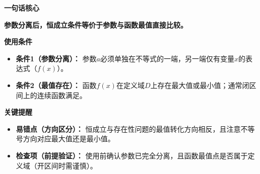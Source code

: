 \begin{summarybox}
	\textbf{\textcolor{CSummary}{一句话核心}}

	\textbf{参数分离后，恒成立条件等价于参数与函数最值直接比较。}

	\medskip
	\textbf{\textcolor{CSummary}{使用条件}}
	\begin{itemize}[leftmargin=*, itemsep=0.5em, topsep=0.4em]
		\item \textbf{条件1（参数分离）：} 参数$a$必须单独在不等式的一端，另一端仅有变量$x$的表达式（$f(x)$）。
		\item \textbf{条件2（最值存在）：} 函数$f(x)$在定义域$D$上存在最大值或最小值；通常闭区间上的连续函数满足。
	\end{itemize}

	\medskip
	\textbf{\textcolor{CSummary}{关键提醒}}
	\begin{itemize}[leftmargin=*, itemsep=0.5em, topsep=0.4em]
		\item \textbf{易错点（方向区分）：} 恒成立与存在性问题的最值转化方向相反，且注意不等号方向对应最大值还是最小值。
		\item \textbf{检查项（前提验证）：} 使用前确认参数已完全分离，且函数最值点是否属于定义域（开区间时需谨慎）。
	\end{itemize}
\end{summarybox}
